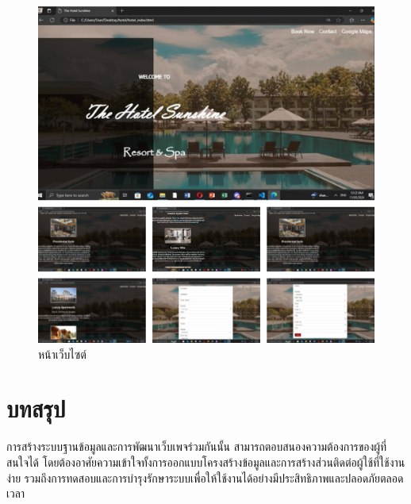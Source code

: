 \documentclass{report}
\begin{document}
\begin{figure}[h!]
\centering
\includegraphics[scale=0.50]{page3.png}
\caption{หน้าเว็บไซต์} 
\label{fig:graph18}
\end{figure} 

\chapter{บทสรุป}
การสร้างระบบฐานข้อมูลและการพัฒนาเว็บเพจร่วมกันนั้น สามารถตอบสนองความต้องการของผู้ที่สนใจได้ โดยต้องอาศัยความเข้าใจทั้งการออกแบบโครงสร้างข้อมูลและการสร้างส่วนติดต่อผู้ใช้ที่ใช้งานง่าย รวมถึงการทดสอบและการบำรุงรักษาระบบเพื่อให้ใช้งานได้อย่างมีประสิทธิภาพและปลอดภัยตลอดเวลา


\printbibliography
\end{document}
